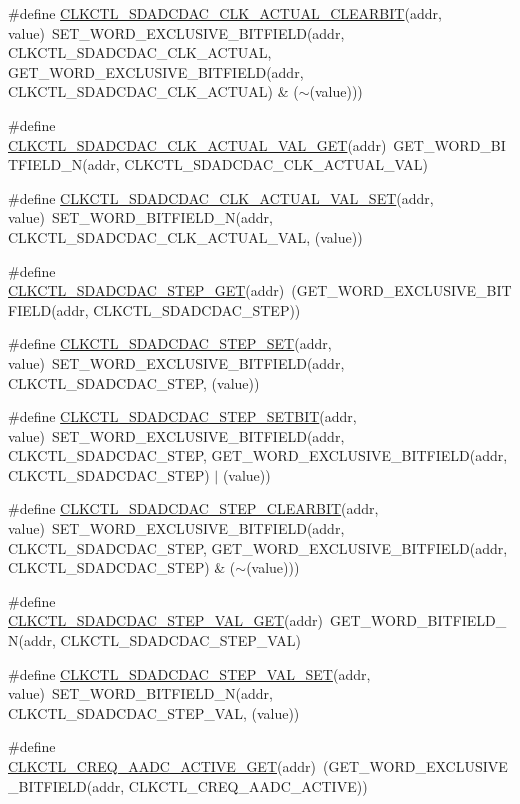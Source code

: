 \begin{DoxyCompactItemize}
\item 
\#define \hyperlink{a00544_a0ced7e54633d0e81be4db89ae7705a56}{CLKCTL\_\-SDADCDAC\_\-CLK\_\-ACTUAL\_\-CLEARBIT}(addr, value)~SET\_\-WORD\_\-EXCLUSIVE\_\-BITFIELD(addr, CLKCTL\_\-SDADCDAC\_\-CLK\_\-ACTUAL, GET\_\-WORD\_\-EXCLUSIVE\_\-BITFIELD(addr, CLKCTL\_\-SDADCDAC\_\-CLK\_\-ACTUAL) \& ($\sim$(value)))
\item 
\#define \hyperlink{a00544_a32e426f5487d818e62605887970cb1c0}{CLKCTL\_\-SDADCDAC\_\-CLK\_\-ACTUAL\_\-VAL\_\-GET}(addr)~GET\_\-WORD\_\-BITFIELD\_\-N(addr, CLKCTL\_\-SDADCDAC\_\-CLK\_\-ACTUAL\_\-VAL)
\item 
\#define \hyperlink{a00544_aca6f13d0d4bc2aa8233121905e3a5509}{CLKCTL\_\-SDADCDAC\_\-CLK\_\-ACTUAL\_\-VAL\_\-SET}(addr, value)~SET\_\-WORD\_\-BITFIELD\_\-N(addr, CLKCTL\_\-SDADCDAC\_\-CLK\_\-ACTUAL\_\-VAL, (value))
\item 
\#define \hyperlink{a00544_ad135b95e3acebdaa661db6134c7fe2eb}{CLKCTL\_\-SDADCDAC\_\-STEP\_\-GET}(addr)~(GET\_\-WORD\_\-EXCLUSIVE\_\-BITFIELD(addr, CLKCTL\_\-SDADCDAC\_\-STEP))
\item 
\#define \hyperlink{a00544_a5c1526fa6a53e1eb4559e998f9636176}{CLKCTL\_\-SDADCDAC\_\-STEP\_\-SET}(addr, value)~SET\_\-WORD\_\-EXCLUSIVE\_\-BITFIELD(addr, CLKCTL\_\-SDADCDAC\_\-STEP, (value))
\item 
\#define \hyperlink{a00544_a16367ce089d39314d1949f666d1b7884}{CLKCTL\_\-SDADCDAC\_\-STEP\_\-SETBIT}(addr, value)~SET\_\-WORD\_\-EXCLUSIVE\_\-BITFIELD(addr, CLKCTL\_\-SDADCDAC\_\-STEP, GET\_\-WORD\_\-EXCLUSIVE\_\-BITFIELD(addr, CLKCTL\_\-SDADCDAC\_\-STEP) $|$ (value))
\item 
\#define \hyperlink{a00544_afb7e06b30b8b0f4e6b744a21a4b55c35}{CLKCTL\_\-SDADCDAC\_\-STEP\_\-CLEARBIT}(addr, value)~SET\_\-WORD\_\-EXCLUSIVE\_\-BITFIELD(addr, CLKCTL\_\-SDADCDAC\_\-STEP, GET\_\-WORD\_\-EXCLUSIVE\_\-BITFIELD(addr, CLKCTL\_\-SDADCDAC\_\-STEP) \& ($\sim$(value)))
\item 
\#define \hyperlink{a00544_a2c7dca4d0a3c5c7ec39c8df104a18877}{CLKCTL\_\-SDADCDAC\_\-STEP\_\-VAL\_\-GET}(addr)~GET\_\-WORD\_\-BITFIELD\_\-N(addr, CLKCTL\_\-SDADCDAC\_\-STEP\_\-VAL)
\item 
\#define \hyperlink{a00544_aca11731bbb939c8d1c1a89e846524ae2}{CLKCTL\_\-SDADCDAC\_\-STEP\_\-VAL\_\-SET}(addr, value)~SET\_\-WORD\_\-BITFIELD\_\-N(addr, CLKCTL\_\-SDADCDAC\_\-STEP\_\-VAL, (value))
\item 
\#define \hyperlink{a00544_afc4fb4d87e5827e5a8eabe5232928a1f}{CLKCTL\_\-CREQ\_\-AADC\_\-ACTIVE\_\-GET}(addr)~(GET\_\-WORD\_\-EXCLUSIVE\_\-BITFIELD(addr, CLKCTL\_\-CREQ\_\-AADC\_\-ACTIVE))

\end{DoxyCompactItemize}
